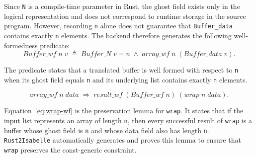 Since \texttt{N} is a compile-time parameter in Rust, the ghost field exists only in the logical representation and does not correspond to runtime storage in the source program.
However, recording \texttt{n} alone does not guarantee that \texttt{Buffer\_data} contains exactly \texttt{n} elements.
The backend therefore generates the following well-formedness predicate:
\begin{equation}
  \mathit{Buffer\_wf}\;n\;v
  \;\triangleq\;
  \mathit{Buffer\_N}\;v = n
  \;\land\;
  \mathit{array\_wf}\;n\;(\mathit{Buffer\_data}\;v).
  \label{eq:buffer-wf}
\end{equation}

The predicate states that a translated buffer is well formed with respect to \texttt{n} when its ghost field equals \texttt{n} and its underlying list contains exactly \texttt{n} elements.

\begin{equation}
  \mathit{array\_wf}\;n\;\mathit{data}
  \;\Longrightarrow\;
  \mathit{result\_wf}\;
    (\mathit{Buffer\_wf}\;n)\;
    (\mathit{wrap}\;n\;\mathit{data}).
  \label{eq:wrap-wf}
\end{equation}

Equation~\eqref{eq:wrap-wf} is the preservation lemma for \texttt{wrap}. 
It states that if the input list represents an array of length \texttt{n}, then every successful result of \texttt{wrap} is a buffer whose ghost field is \texttt{n} and whose data field also has length \texttt{n}.
\texttt{Rust2Isabelle} automatically generates and proves this lemma to ensure that \texttt{wrap} preserves the const-generic constraint.



